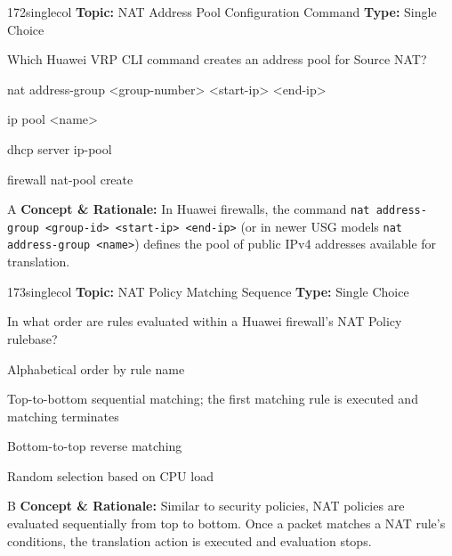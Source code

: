 \begin{qcard}{172}{singlecol}
\textcolor{darkslate!75}{\small\textbf{Topic:} NAT Address Pool Configuration Command \hfill \textbf{Type:} Single Choice}\vspace{0.4em}\par
Which Huawei VRP CLI command creates an address pool for Source NAT?
\begin{qoptions}
\item nat address-group \textless{}group-number\textgreater{} \textless{}start-ip\textgreater{} \textless{}end-ip\textgreater{}
\item ip pool \textless{}name\textgreater{}
\item dhcp server ip-pool
\item firewall nat-pool create
\end{qoptions}
\end{qcard}
\nopagebreak
\begin{explainbox}{A}
\textbf{Concept \& Rationale:} In Huawei firewalls, the command \texttt{nat address-group \textless{}group-id\textgreater{} \textless{}start-ip\textgreater{} \textless{}end-ip\textgreater{}} (or in newer USG models \texttt{nat address-group \textless{}name\textgreater{}}) defines the pool of public IPv4 addresses available for translation.
\end{explainbox}

\begin{qcard}{173}{singlecol}
\textcolor{darkslate!75}{\small\textbf{Topic:} NAT Policy Matching Sequence \hfill \textbf{Type:} Single Choice}\vspace{0.4em}\par
In what order are rules evaluated within a Huawei firewall's NAT Policy rulebase?
\begin{qoptions}
\item Alphabetical order by rule name
\item Top-to-bottom sequential matching; the first matching rule is executed and matching terminates
\item Bottom-to-top reverse matching
\item Random selection based on CPU load
\end{qoptions}
\end{qcard}
\nopagebreak
\begin{explainbox}{B}
\textbf{Concept \& Rationale:} Similar to security policies, NAT policies are evaluated sequentially from top to bottom. Once a packet matches a NAT rule's conditions, the translation action is executed and evaluation stops.
\end{explainbox}

